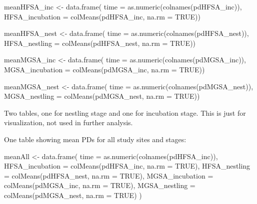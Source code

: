 \documentclass[
]{article}
\newenvironment{Shaded}{\begin{snugshade}}{\end{snugshade}}
\newcommand{\AttributeTok}[1]{\textcolor[rgb]{0.77,0.63,0.00}{#1}}
\newcommand{\ConstantTok}[1]{\textcolor[rgb]{0.00,0.00,0.00}{#1}}
\newcommand{\FunctionTok}[1]{\textcolor[rgb]{0.00,0.00,0.00}{#1}}
\newcommand{\NormalTok}[1]{#1}
\newcommand{\OtherTok}[1]{\textcolor[rgb]{0.56,0.35,0.01}{#1}}
\begin{document}
\begin{Shaded}
\begin{Highlighting}[]
\NormalTok{meanHFSA\_inc }\OtherTok{\textless{}{-}} \FunctionTok{data.frame}\NormalTok{(}
  \AttributeTok{time =} \FunctionTok{as.numeric}\NormalTok{(}\FunctionTok{colnames}\NormalTok{(pdHFSA\_inc)),}
  \AttributeTok{HFSA\_incubation =} \FunctionTok{colMeans}\NormalTok{(pdHFSA\_inc, }\AttributeTok{na.rm =} \ConstantTok{TRUE}\NormalTok{))}

\NormalTok{meanHFSA\_nest }\OtherTok{\textless{}{-}} \FunctionTok{data.frame}\NormalTok{(}
  \AttributeTok{time =} \FunctionTok{as.numeric}\NormalTok{(}\FunctionTok{colnames}\NormalTok{(pdHFSA\_nest)),}
  \AttributeTok{HFSA\_nestling =} \FunctionTok{colMeans}\NormalTok{(pdHFSA\_nest, }\AttributeTok{na.rm =} \ConstantTok{TRUE}\NormalTok{))}

\NormalTok{meanMGSA\_inc }\OtherTok{\textless{}{-}} \FunctionTok{data.frame}\NormalTok{(}
  \AttributeTok{time =} \FunctionTok{as.numeric}\NormalTok{(}\FunctionTok{colnames}\NormalTok{(pdMGSA\_inc)),}
  \AttributeTok{MGSA\_incubation =} \FunctionTok{colMeans}\NormalTok{(pdMGSA\_inc, }\AttributeTok{na.rm =} \ConstantTok{TRUE}\NormalTok{))}

\NormalTok{meanMGSA\_nest }\OtherTok{\textless{}{-}} \FunctionTok{data.frame}\NormalTok{(}
  \AttributeTok{time =} \FunctionTok{as.numeric}\NormalTok{(}\FunctionTok{colnames}\NormalTok{(pdMGSA\_nest)),}
  \AttributeTok{MGSA\_nestling =} \FunctionTok{colMeans}\NormalTok{(pdMGSA\_nest, }\AttributeTok{na.rm =} \ConstantTok{TRUE}\NormalTok{))}
\end{Highlighting}
\end{Shaded}

Two tables, one for nestling stage and one for incubation stage. This is
just for visualization, not used in further analysis.

One table showing mean PDs for all study sites and stages:

\begin{Shaded}
\begin{Highlighting}[]
\NormalTok{meanAll }\OtherTok{\textless{}{-}} \FunctionTok{data.frame}\NormalTok{(}
  \AttributeTok{time =} \FunctionTok{as.numeric}\NormalTok{(}\FunctionTok{colnames}\NormalTok{(pdHFSA\_inc)),}
  \AttributeTok{HFSA\_incubation =} \FunctionTok{colMeans}\NormalTok{(pdHFSA\_inc, }\AttributeTok{na.rm =} \ConstantTok{TRUE}\NormalTok{),}
  \AttributeTok{HFSA\_nestling =} \FunctionTok{colMeans}\NormalTok{(pdHFSA\_nest, }\AttributeTok{na.rm =} \ConstantTok{TRUE}\NormalTok{),}
  \AttributeTok{MGSA\_incubation =} \FunctionTok{colMeans}\NormalTok{(pdMGSA\_inc, }\AttributeTok{na.rm =} \ConstantTok{TRUE}\NormalTok{),}
  \AttributeTok{MGSA\_nestling =} \FunctionTok{colMeans}\NormalTok{(pdMGSA\_nest, }\AttributeTok{na.rm =} \ConstantTok{TRUE}\NormalTok{)}
\NormalTok{)}
\end{Highlighting}
\end{Shaded}
\end{document}
